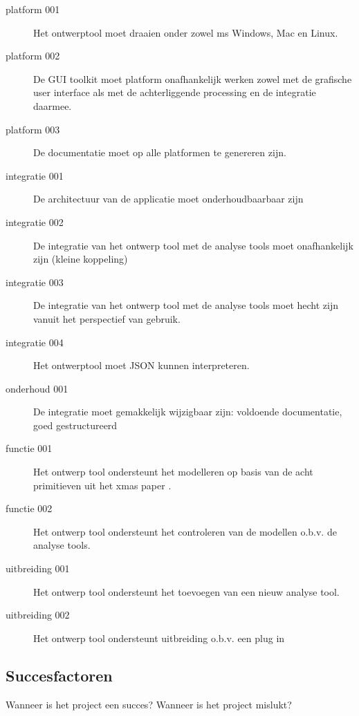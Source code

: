 \begin{description}
 \item[platform 001] Het ontwerptool moet draaien onder zowel ms Windows, Mac en Linux.
 \item[platform 002] De GUI toolkit moet platform onafhankelijk werken zowel met de
 grafische user interface als met de achterliggende processing en de integratie daarmee.
 \item[platform 003] De documentatie moet op alle platformen te genereren zijn.
 \item[integratie 001] De architectuur van de applicatie moet onderhoudbaarbaar zijn
 \item[integratie 002] De integratie van het ontwerp tool met de analyse tools moet onafhankelijk zijn (kleine koppeling)
 \item[integratie 003] De integratie van het ontwerp tool met de analyse tools moet hecht zijn
 vanuit het perspectief van gebruik.
 \item[integratie 004] Het ontwerptool moet JSON kunnen interpreteren.
 \item[onderhoud 001] De integratie moet gemakkelijk wijzigbaar zijn: voldoende documentatie, goed gestructureerd
 \item[functie 001] Het ontwerp tool ondersteunt het modelleren op basis van de acht primitieven uit het xmas paper \cite{chatterjee-kishinevsky:xmas}.
 \item[functie 002] Het ontwerp tool ondersteunt het controleren van de modellen o.b.v. de analyse tools.
 \item[uitbreiding 001] Het ontwerp tool ondersteunt het toevoegen van een nieuw analyse tool.
 \item[uitbreiding 002] Het ontwerp tool ondersteunt uitbreiding o.b.v. een plug in
\end{description}



\subsection{Succesfactoren}
Wanneer is het project een succes?
Wanneer is het project mislukt?
